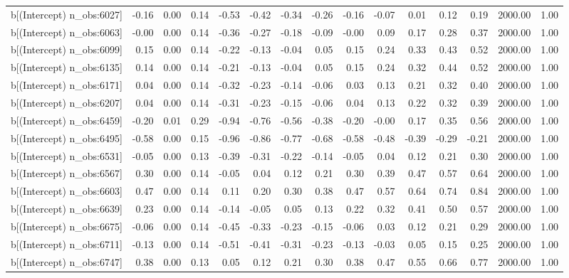 \begin{table}[ht]
\begin{tabular}{rrrrrrrrrrrrrrr}
  b[(Intercept) n\_obs:6027] & -0.16 & 0.00 & 0.14 & -0.53 & -0.42 & -0.34 & -0.26 & -0.16 & -0.07 & 0.01 & 0.12 & 0.19 & 2000.00 & 1.00 \\ 
  b[(Intercept) n\_obs:6063] & -0.00 & 0.00 & 0.14 & -0.36 & -0.27 & -0.18 & -0.09 & -0.00 & 0.09 & 0.17 & 0.28 & 0.37 & 2000.00 & 1.00 \\ 
  b[(Intercept) n\_obs:6099] & 0.15 & 0.00 & 0.14 & -0.22 & -0.13 & -0.04 & 0.05 & 0.15 & 0.24 & 0.33 & 0.43 & 0.52 & 2000.00 & 1.00 \\ 
  b[(Intercept) n\_obs:6135] & 0.14 & 0.00 & 0.14 & -0.21 & -0.13 & -0.04 & 0.05 & 0.15 & 0.24 & 0.32 & 0.44 & 0.52 & 2000.00 & 1.00 \\ 
  b[(Intercept) n\_obs:6171] & 0.04 & 0.00 & 0.14 & -0.32 & -0.23 & -0.14 & -0.06 & 0.03 & 0.13 & 0.21 & 0.32 & 0.40 & 2000.00 & 1.00 \\ 
  b[(Intercept) n\_obs:6207] & 0.04 & 0.00 & 0.14 & -0.31 & -0.23 & -0.15 & -0.06 & 0.04 & 0.13 & 0.22 & 0.32 & 0.39 & 2000.00 & 1.00 \\ 
  b[(Intercept) n\_obs:6459] & -0.20 & 0.01 & 0.29 & -0.94 & -0.76 & -0.56 & -0.38 & -0.20 & -0.00 & 0.17 & 0.35 & 0.56 & 2000.00 & 1.00 \\ 
  b[(Intercept) n\_obs:6495] & -0.58 & 0.00 & 0.15 & -0.96 & -0.86 & -0.77 & -0.68 & -0.58 & -0.48 & -0.39 & -0.29 & -0.21 & 2000.00 & 1.00 \\ 
  b[(Intercept) n\_obs:6531] & -0.05 & 0.00 & 0.13 & -0.39 & -0.31 & -0.22 & -0.14 & -0.05 & 0.04 & 0.12 & 0.21 & 0.30 & 2000.00 & 1.00 \\ 
  b[(Intercept) n\_obs:6567] & 0.30 & 0.00 & 0.14 & -0.05 & 0.04 & 0.12 & 0.21 & 0.30 & 0.39 & 0.47 & 0.57 & 0.64 & 2000.00 & 1.00 \\ 
  b[(Intercept) n\_obs:6603] & 0.47 & 0.00 & 0.14 & 0.11 & 0.20 & 0.30 & 0.38 & 0.47 & 0.57 & 0.64 & 0.74 & 0.84 & 2000.00 & 1.00 \\ 
  b[(Intercept) n\_obs:6639] & 0.23 & 0.00 & 0.14 & -0.14 & -0.05 & 0.05 & 0.13 & 0.22 & 0.32 & 0.41 & 0.50 & 0.57 & 2000.00 & 1.00 \\ 
  b[(Intercept) n\_obs:6675] & -0.06 & 0.00 & 0.14 & -0.45 & -0.33 & -0.23 & -0.15 & -0.06 & 0.03 & 0.12 & 0.21 & 0.29 & 2000.00 & 1.00 \\ 
  b[(Intercept) n\_obs:6711] & -0.13 & 0.00 & 0.14 & -0.51 & -0.41 & -0.31 & -0.23 & -0.13 & -0.03 & 0.05 & 0.15 & 0.25 & 2000.00 & 1.00 \\ 
  b[(Intercept) n\_obs:6747] & 0.38 & 0.00 & 0.13 & 0.05 & 0.12 & 0.21 & 0.30 & 0.38 & 0.47 & 0.55 & 0.66 & 0.77 & 2000.00 & 1.00 \\ 

\end{tabular}
\end{table}
